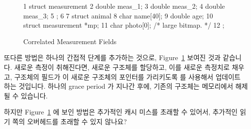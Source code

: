 \begin{figure}[tbp]
{ \scriptsize
\begin{verbbox}
 1 struct measurement {
 2   double meas_1;
 3   double meas_2;
 4   double meas_3;
 5 };
 6 
 7 struct animal {
 8   char name[40];
 9   double age;
10   struct measurement *mp;
11   char photo[0]; /* large bitmap. */
12 };
\end{verbbox}
}
\centering
\theverbbox
\caption{Correlated Measurement Fields}
\label{fig:together:Correlated Measurement Fields}
\end{figure}

또다른 방법은 하나의 간접적 단계를 추가하는 것으로,
Figure~\ref{fig:together:Correlated Measurement Fields} 보여진 것과 같습니다.
새로운 측정이 취해진다면, 새로운  구조체를 할당하고, 이를
새로운 측정치로 채우고,  구조체의  필드가 이 새로운
 구조체의 포인터를 가리키도록  를
사용해서 업데이트 하는 것입니다.
하나의 grace period 가 지나간 후에, 기존의  구조체는 메모리에서
해제될 수 있습니다.
\iffalse

Another approach is to insert a level of indirection, as shown in
Figure~\ref{fig:together:Correlated Measurement Fields}.
When a new measurement is taken, a new \co{measurement} structure
is allocated, filled in with the measurements, and the \co{animal}
structure's \co{->mp} field is updated to point to this new
\co{measurement} structure using \co{rcu_assign_pointer()}.
After a grace period elapses, the old \co{measurement} structure
can be freed.
\fi

\QuickQuiz{}
	하지만
	Figure~\ref{fig:together:Correlated Measurement Fields}
	에 보인 방법은 추가적인 캐시 미스를 초래할 수 있어서, 추가적인 읽기
	쪽의 오버헤드를 초래할 수 있지 않나요?
	\iffalse

